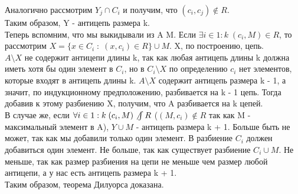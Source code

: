 Аналогично рассмотрим $Y_j \cap C_i$ и получим, что $(c_i, c_j) \not\in R$.\\
Таким образом, Y - антицепь размера k. \\
Теперь вспомним, что мы выкидывали из A M. Если $\exists i \in 1:k \; (c_i, M) \in R$, то рассмотрим $X = \{x \in C_i \; : \; (x, c_i) \in R\} \cup {M}$. X, по построению, цепь.\\
$A \setminus X$ не содержит антицепи длины k, так как любая антицепь длины k должна иметь хотя бы один элемент в $C_i$, но в $C_i \setminus X$ по определению $c_i$ нет элементов, которые входят в антицепь длины k. $A \setminus X$ содержит антицепь размера k - 1, а значит, по индукционному предположению, разбивается на k - 1 цепь. Тогда добавив к этому разбиению X, получим, что A разбивается на k цепей. \\
В случае же, если $\forall i \in 1:k \; (c_i, M) \not\int R$ ($(M, c_i) \not\in R$ так как M - максимальный элемент в A), $Y \cup {M}$ - антицепь размера k + 1. Больше быть не может, так как мы добавили только один элемент. В разбиение $C_i$ должен добавиться один элемент. Не больше, так как существует разбиение $C_i \cup {M}$. Не меньше, так как размер разбиения на цепи не меньше чем размер любой антицепи, а у нас есть антицепь размера k + 1. \\
Таким образом, теорема Дилуорса доказана.
